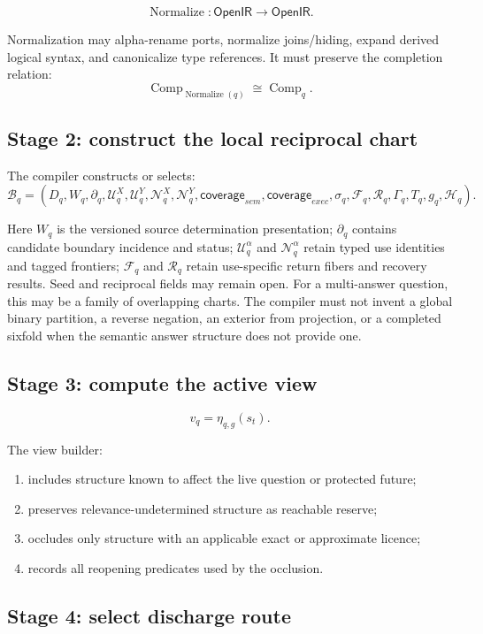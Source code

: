 \documentclass[11pt,oneside]{article}
\newcommand{\OpenIR}{\mathsf{OpenIR}}
\newcommand{\Comp}{\operatorname{Comp}}
\newcommand{\Normalize}{\operatorname{Normalize}}
\begin{document}
\[
\Normalize:
\OpenIR\to\OpenIR.
\]

Normalization may alpha-rename ports, normalize joins/hiding, expand derived logical syntax, and canonicalize type references.  It must preserve the completion relation:
\[
\Comp_{\Normalize(q)}\cong\Comp_q.
\]

\subsection{Stage 2: construct the local reciprocal chart}

The compiler constructs or selects:
\[
\boxed{
\mathcal B_q=
(
D_q,
W_q,
\partial_q,
\mathcal U_q^X,
\mathcal U_q^Y,
\mathcal N_q^X,
\mathcal N_q^Y,
\mathsf{coverage}_{sem},
\mathsf{coverage}_{exec},
\sigma_q,
\mathcal F_q,
\mathcal R_q,
\Gamma_q,
T_q,
g_q,
\mathcal H_q
).
}
\]

Here \(W_q\) is the versioned source determination presentation; \(\partial_q\) contains candidate boundary incidence and status; \(\mathcal U_q^\alpha\) and \(\mathcal N_q^\alpha\) retain typed use identities and tagged frontiers; \(\mathcal F_q\) and \(\mathcal R_q\) retain use-specific return fibers and recovery results.  Seed and reciprocal fields may remain open.  For a multi-answer question, this may be a family of overlapping charts.  The compiler must not invent a global binary partition, a reverse negation, an exterior from projection, or a completed sixfold when the semantic answer structure does not provide one.

\subsection{Stage 3: compute the active view}

\[
v_q=\eta_{q,g}(s_t).
\]

The view builder:
\begin{enumerate}
\item includes structure known to affect the live question or protected future;
\item preserves relevance-undetermined structure as reachable reserve;
\item occludes only structure with an applicable exact or approximate licence;
\item records all reopening predicates used by the occlusion.
\end{enumerate}

\subsection{Stage 4: select discharge route}
\end{document}
